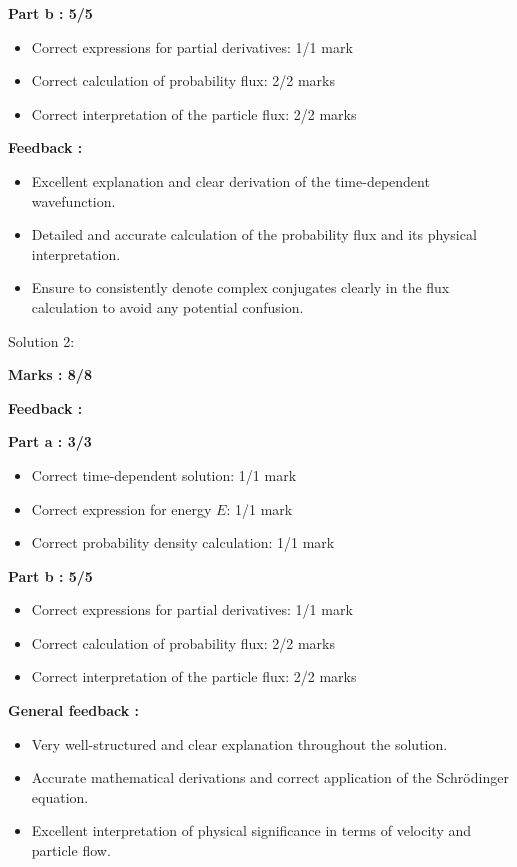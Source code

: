 \documentclass[a4paper,11pt]{article}
\begin{document}
\textbf{Part b : 5/5}

\begin{itemize}
    \item Correct expressions for partial derivatives: 1/1 mark
    \item Correct calculation of probability flux: 2/2 marks
    \item Correct interpretation of the particle flux: 2/2 marks
\end{itemize}


\textbf{Feedback :}

\begin{itemize}
    \item Excellent explanation and clear derivation of the time-dependent wavefunction.
    \item Detailed and accurate calculation of the probability flux and its physical interpretation.
    \item Ensure to consistently denote complex conjugates clearly in the flux calculation to avoid any potential confusion.
\end{itemize}


Solution 2:

\textbf{Marks : 8/8}

\textbf{Feedback : }

\textbf{Part a : 3/3}

\begin{itemize}
    \item Correct time-dependent solution: 1/1 mark
    \item Correct expression for energy $E$: 1/1 mark
    \item Correct probability density calculation: 1/1 mark
\end{itemize}


\textbf{Part b : 5/5}

\begin{itemize}
    \item Correct expressions for partial derivatives: 1/1 mark
    \item Correct calculation of probability flux: 2/2 marks
    \item Correct interpretation of the particle flux: 2/2 marks
\end{itemize}


\textbf{General feedback :}

\begin{itemize}
    \item Very well-structured and clear explanation throughout the solution.
    \item Accurate mathematical derivations and correct application of the Schrödinger equation.
    \item Excellent interpretation of physical significance in terms of velocity and particle flow.
\end{itemize}
\end{document}
